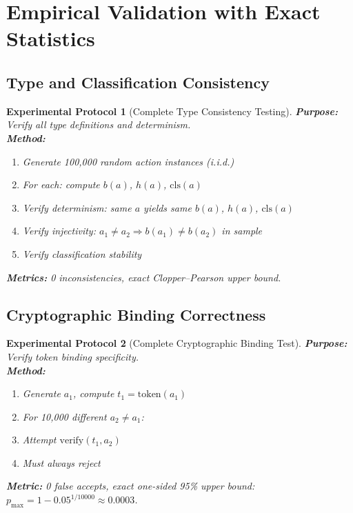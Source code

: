 \documentclass[12pt]{article}
\newtheorem{protocol}{Experimental Protocol}[section]
\begin{document}
\section{Empirical Validation with Exact Statistics}

\subsection{Type and Classification Consistency}

\begin{protocol}[Complete Type Consistency Testing]
\textbf{Purpose:} Verify all type definitions and determinism.\\
\textbf{Method:}
\begin{enumerate}
    \item Generate 100,000 random action instances (i.i.d.)
    \item For each: compute $b(a)$, $h(a)$, $\mathrm{cls}(a)$
    \item Verify determinism: same $a$ yields same $b(a)$, $h(a)$, $\mathrm{cls}(a)$
    \item Verify injectivity: $a_1 \neq a_2 \Rightarrow b(a_1) \neq b(a_2)$ in sample
    \item Verify classification stability
\end{enumerate}
\textbf{Metrics:} 0 inconsistencies, exact Clopper--Pearson upper bound.
\end{protocol}

\subsection{Cryptographic Binding Correctness}

\begin{protocol}[Complete Cryptographic Binding Test]
\textbf{Purpose:} Verify token binding specificity.\\
\textbf{Method:}
\begin{enumerate}
    \item Generate $a_1$, compute $t_1 = \mathrm{token}(a_1)$
    \item For 10,000 different $a_2 \neq a_1$:
    \item Attempt $\mathrm{verify}(t_1, a_2)$
    \item Must always reject
\end{enumerate}
\textbf{Metric:} 0 false accepts, exact one-sided 95\% upper bound: $p_{\max} = 1 - 0.05^{1/10000} \approx 0.0003$.
\end{protocol}
\end{document}
